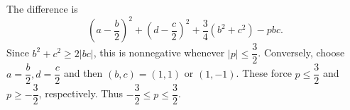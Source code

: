 The difference is
\[
\left(a-\dfrac{b}{2}\right)^2+\left(d-\dfrac{c}{2}\right)^2+\dfrac{3}{4}(b^2+c^2)-pbc.
\]
Since $b^2+c^2\ge2|bc|$, this is nonnegative whenever $|p|\le\dfrac{3}{2}$. Conversely, choose $a=\dfrac{b}{2},d=\dfrac{c}{2}$ and then $(b,c)=(1,1)$ or $(1,-1)$. These force $p\le\dfrac{3}{2}$ and $p\ge-\dfrac{3}{2}$, respectively. Thus $\boxed{-\dfrac{3}{2}\le p\le\dfrac{3}{2}}$.
